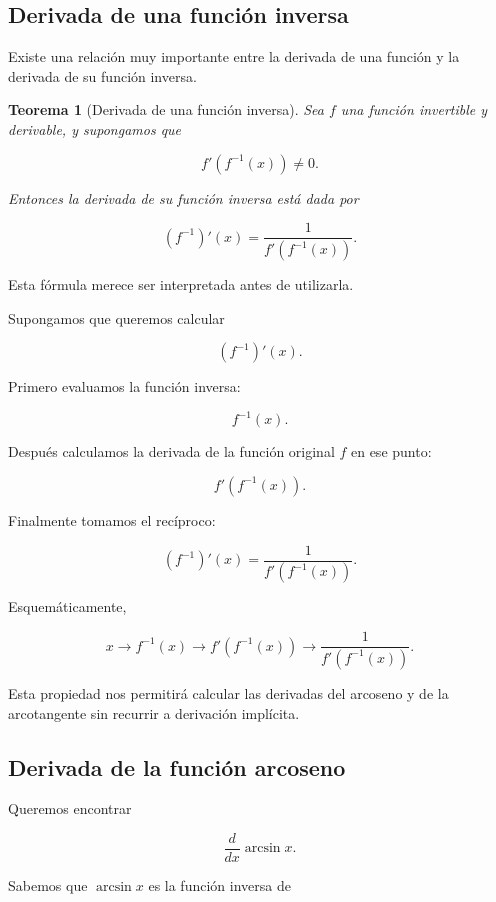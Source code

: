 \documentclass[12pt]{article}
\newtheorem{teorema}{Teorema}[section]
\theoremstyle{definition}
\theoremstyle{remark}
\begin{document}
\subsection{Derivada de una función inversa}

Existe una relación muy importante entre la derivada de una función y
la derivada de su función inversa.

\begin{teorema}[Derivada de una función inversa]
Sea $f$ una función invertible y derivable, y supongamos que

\[
f'(f^{-1}(x))\neq 0.
\]

Entonces la derivada de su función inversa está dada por

\[
\boxed{
(f^{-1})'(x)
=
\frac{1}{f'(f^{-1}(x))}.
}
\]
\end{teorema}

Esta fórmula merece ser interpretada antes de utilizarla.

Supongamos que queremos calcular

\[
(f^{-1})'(x).
\]

Primero evaluamos la función inversa:

\[
f^{-1}(x).
\]

Después calculamos la derivada de la función original $f$ en ese punto:

\[
f'(f^{-1}(x)).
\]

Finalmente tomamos el recíproco:

\[
(f^{-1})'(x)
=
\frac{1}{f'(f^{-1}(x))}.
\]

Esquemáticamente,

\[
\boxed{
x
\longrightarrow
f^{-1}(x)
\longrightarrow
f'(f^{-1}(x))
\longrightarrow
\frac{1}{f'(f^{-1}(x))}.
}
\]

Esta propiedad nos permitirá calcular las derivadas del arcoseno y de
la arcotangente sin recurrir a derivación implícita.

\subsection{Derivada de la función arcoseno}

Queremos encontrar

\[
\frac{d}{dx}\arcsin x.
\]

Sabemos que $\arcsin x$ es la función inversa de
\end{document}
